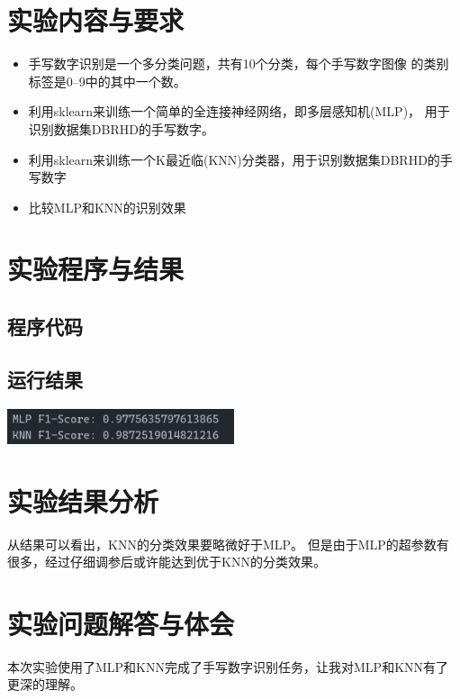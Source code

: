 \documentclass[a4paper]{ctexart}
\begin{document}
  \section{实验内容与要求}
  \begin{itemize}
    \item 手写数字识别是一个多分类问题，共有10个分类，每个手写数字图像
    的类别标签是0--9中的其中一个数。
    \item 利用sklearn来训练一个简单的全连接神经网络，即多层感知机(MLP)，
    用于识别数据集DBRHD的手写数字。
    \item 利用sklearn来训练一个K最近临(KNN)分类器，用于识别数据集DBRHD的手写数字
    \item 比较MLP和KNN的识别效果
  \end{itemize}

  \section{实验程序与结果}
  \subsection{程序代码}
  
  \subsection{运行结果}
  \includegraphics[width=0.5\textwidth]{fig/output.png}

  \newpage
  \section{实验结果分析}
  从结果可以看出，KNN的分类效果要略微好于MLP。
  但是由于MLP的超参数有很多，经过仔细调参后或许能达到优于KNN的分类效果。

  \section{实验问题解答与体会}
  本次实验使用了MLP和KNN完成了手写数字识别任务，让我对MLP和KNN有了更深的理解。
\end{document}
